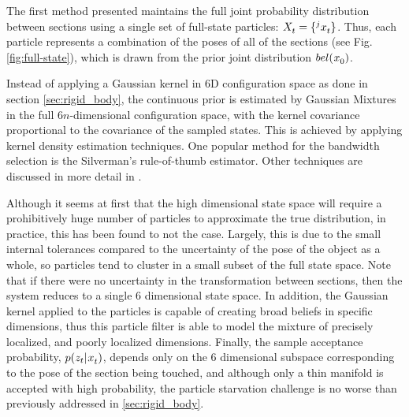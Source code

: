\documentclass[../thesis.tex]{subfiles}
\begin{document}
The first method presented maintains the full joint probability distribution between sections using a single set of full-state particles: $\particles[t] = \{\particle[t][j]\}$. 
Thus, each particle represents a combination of the poses of all of the sections (see Fig. \ref{fig:full-state}), which is drawn from the prior joint distribution $bel(\particle[0])$.

Instead of applying a Gaussian kernel in 6D configuration space as done in section \ref{sec:rigid_body}, the continuous prior is estimated by Gaussian Mixtures in the full $6n$-dimensional configuration space, with the kernel covariance proportional to the covariance of the sampled states. This is achieved by applying kernel density estimation techniques. One popular method for the bandwidth selection is the Silverman's rule-of-thumb estimator\cite{Silverman1986}. Other techniques are discussed in more detail in \cite{sheather2004density}.


Although it seems at first that the high dimensional state space will require a prohibitively huge number of particles to approximate the true distribution, in practice, this has been found to not the case. 
Largely, this is due to the small internal tolerances compared to the uncertainty of the pose of the object as a whole, so particles tend to cluster in a small subset of the full state space. 
Note that if there were no uncertainty in the transformation between sections, then the system reduces to a single 6 dimensional state space.
In addition, the Gaussian kernel applied to the particles is capable of creating broad beliefs in specific dimensions\cite{Saund2017}, thus this particle filter is able to model the mixture of precisely localized, and poorly localized dimensions. 
Finally, the sample acceptance probability, $p(z_t|\particle[t])$, depends only on the 6 dimensional subspace corresponding to the pose of the section being touched, and although only a thin manifold is accepted with high probability, the particle starvation challenge is no worse than previously addressed in \ref{sec:rigid_body}.
\end{document}
